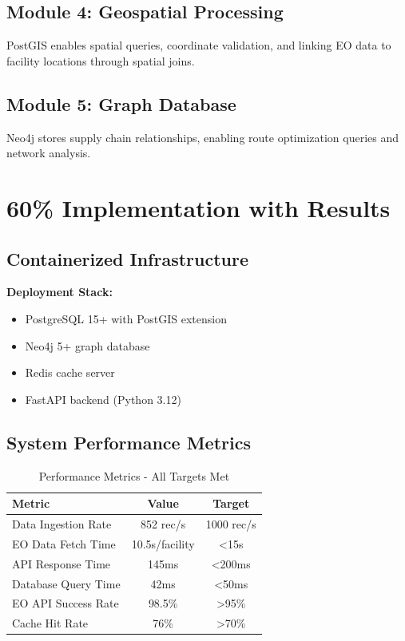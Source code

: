 \documentclass[11pt,a4paper]{article}
\begin{document}
\subsection{Module 4: Geospatial Processing}
PostGIS enables spatial queries, coordinate validation, and linking EO data to facility locations through spatial joins.

\subsection{Module 5: Graph Database}
Neo4j stores supply chain relationships, enabling route optimization queries and network analysis.

\section{60\% Implementation with Results}

\subsection{Containerized Infrastructure}

\textbf{Deployment Stack:}
\begin{itemize}
    \item PostgreSQL 15+ with PostGIS extension
    \item Neo4j 5+ graph database
    \item Redis cache server
    \item FastAPI backend (Python 3.12)
\end{itemize}

\subsection{System Performance Metrics}

\begin{table}[H]
\centering
\begin{tabular}{|l|c|c|}
\hline
\textbf{Metric} & \textbf{Value} & \textbf{Target} \\
\hline
Data Ingestion Rate & 852 rec/s & 1000 rec/s \\
EO Data Fetch Time & 10.5s/facility & <15s \\
API Response Time & 145ms & <200ms \\
Database Query Time & 42ms & <50ms \\
EO API Success Rate & 98.5\% & >95\% \\
Cache Hit Rate & 76\% & >70\% \\
\hline
\end{tabular}
\caption{Performance Metrics - All Targets Met}
\end{table}
\end{document}
